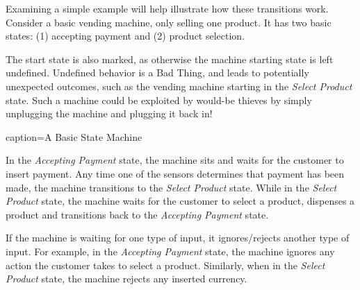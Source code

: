 \documentclass[../main.tex]{subfiles}
\begin{document}
Examining a simple example will help illustrate how these transitions work.
Consider a basic vending machine, only selling one product. It has two basic states:
(1) accepting payment and
(2) product selection.

The start state is also marked, as otherwise the machine starting state is left
undefined. Undefined behavior is a Bad Thing\texttrademark, and leads to
potentially unexpected outcomes, such as the vending machine starting in the
\textit{Select Product} state. Such a machine could be exploited by would-be
thieves by simply unplugging the machine and plugging it back in!

\begin{obifig}{caption=A Basic State Machine}
\end{obifig}

In the \textit{Accepting Payment} state, the machine sits and waits for the customer
to insert payment. Any time one of the sensors determines that payment has been made,
the machine transitions to the \textit{Select Product} state. While in the
\textit{Select Product} state, the machine waits for the customer to select a product,
dispenses a product and transitions back to the \textit{Accepting Payment} state.

If the machine is waiting for one type of input, it ignores/rejects another type of
input. For example, in the \textit{Accepting Payment} state, the machine ignores
any action the customer takes to select a product. Similarly, when in the
\textit{Select Product} state, the machine rejects any inserted currency.
\end{document}
